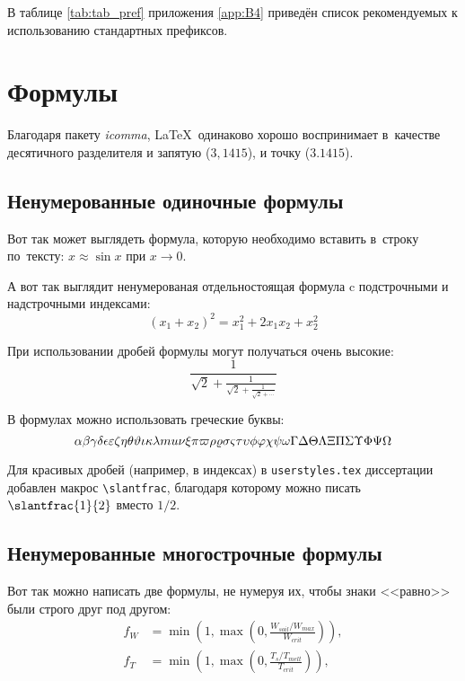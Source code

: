 В таблице \ref{tab:tab_pref} приложения \ref{app:B4} приведён список рекомендуемых
к использованию стандартных префиксов.

\section{Формулы} \label{sec:ch1/sec0}

Благодаря пакету \textit{icomma}, \LaTeX~одинаково хорошо воспринимает
в~качестве десятичного разделителя и запятую ($3,1415$), и точку ($3.1415$).

\subsection{Ненумерованные одиночные формулы} \label{subsec:ch1/sec3/sub1}

Вот так может выглядеть формула, которую необходимо вставить в~строку
по~тексту: $x \approx \sin x$ при $x \to 0$.

А вот так выглядит ненумерованая отдельностоящая формула c подстрочными
и надстрочными индексами:
\[
(x_1+x_2)^2 = x_1^2 + 2 x_1 x_2 + x_2^2
\]

При использовании дробей формулы могут получаться очень высокие:
\[
  \frac{1}{\sqrt{2}+
  \displaystyle\frac{1}{\sqrt{2}+
  \displaystyle\frac{1}{\sqrt{2}+\cdots}}}
\]

В формулах можно использовать греческие буквы:
\[
\alpha\beta\gamma\delta\epsilon\varepsilon\zeta\eta\theta\vartheta\iota\kappa%
\lambda\\mu\nu\xi\pi\varpi\rho\varrho\sigma\varsigma\tau\upsilon\phi\varphi%
\chi\psi\omega\Gamma\Delta\Theta\Lambda\Xi\Pi\Sigma\Upsilon\Phi\Psi\Omega
\]

Для красивых дробей (например, в индексах) в
\verb+userstyles.tex+ диссертации добавлен макрос
\verb+\slantfrac+, благодаря которому можно
писать $\slantfrac{1}{2}$ вместо $1/2$.

\subsection{Ненумерованные многострочные формулы} \label{subsec:ch1/sec3/sub2}

Вот так можно написать две формулы, не нумеруя их, чтобы знаки <<равно>> были
строго друг под другом:
\begin{align}
  f_W & =  \min \left( 1, \max \left( 0, \frac{W_{soil} / W_{max}}{W_{crit}} \right)  \right), \nonumber \\
  f_T & =  \min \left( 1, \max \left( 0, \frac{T_s / T_{melt}}{T_{crit}} \right)  \right), \nonumber
\end{align}

